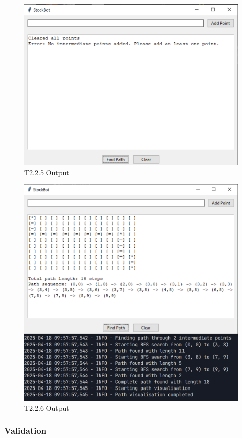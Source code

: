 \begin{figure}[htbp!]
	\centering
	\includegraphics[width=1\linewidth]{Images/t2.2.x1.png}
	\caption{T2.2.5 Output}
	\label{fig:enter-label}
\end{figure}

\begin{figure}[htbp!]
	\centering
	\includegraphics[width=0.75\linewidth]{Images/t2.2.6.png}
	\caption{T2.2.6 Output}
	\label{fig:enter-label}
\end{figure}

\subsubsection{Validation}

